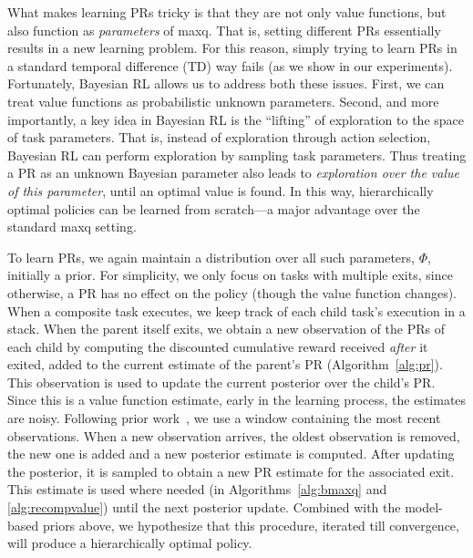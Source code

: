What makes learning PRs tricky is that they are not only
value functions, but also function as {\em parameters} of {\sc
maxq}. That is, setting different PRs essentially results
in a new learning problem. For this reason, simply trying to learn
PRs in a standard temporal difference (TD) way fails (as we
show in our experiments).  Fortunately,
 Bayesian RL allows us to address both these issues.  First, we
can treat value functions as probabilistic unknown parameters. Second,
and more importantly, a key idea in Bayesian RL is the ``lifting'' of
exploration to the space of task parameters. That is, instead of
exploration through action selection, Bayesian RL can perform
exploration by sampling task parameters. Thus treating a PR
as an unknown Bayesian parameter also leads to {\em exploration over
the value of this parameter}, until an optimal value is found. In this
way, hierarchically optimal policies can be learned from scratch---a
major advantage over the standard {\sc maxq} setting. 

To learn PRs, we again maintain a distribution over all
such parameters, $\Phi$, initially a prior. For simplicity, we only
focus on tasks with multiple exits, since otherwise, a PR
has no effect on the policy (though the value function changes). When
a composite task executes, we keep track of each child task's
execution in a stack. When the parent itself exits, we obtain a new
observation of the PRs of each child by computing the
discounted cumulative reward received {\em after} it exited, added to
the current estimate of the parent's PR
(Algorithm~\ref{alg:pr}). This observation is used to update the
current posterior over the child's PR. Since this is a
value function estimate, early in the learning process, the estimates
are noisy. Following prior work~\cite{Dearden98}, we use a window
containing the most recent observations. When a new observation
arrives, the oldest observation is removed, the new one is added and a
new posterior estimate is computed. After updating the posterior, it
is sampled to obtain a new PR estimate for the associated
exit. This estimate is used where needed (in
Algorithms~\ref{alg:bmaxq} and \ref{alg:recompvalue}) until the next
posterior update. Combined with the model-based priors above, we
hypothesize that this procedure, iterated till convergence, will
produce a hierarchically optimal policy.
